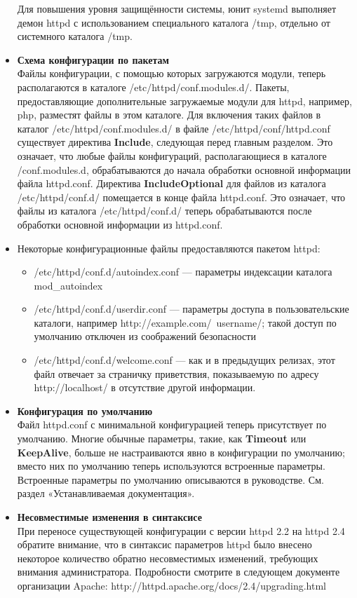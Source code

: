 \documentclass[a4paper,10pt,twoside]{article}
\begin{document}
\begin{itemize}
Для повышения уровня защищённости системы, юнит systemd выполняет демон httpd с использованием специального каталога /tmp, отдельно от системного каталога /tmp.
\item \textbf{Схема конфигурации по пакетам}\\
Файлы конфигурации, с помощью которых загружаются модули, теперь располагаются в каталоге /etc/httpd/conf.modules.d/. Пакеты, предоставляющие дополнительные загружаемые модули для httpd, например, php, разместят файлы в этом каталоге. Для включения таких файлов в каталог /etc/httpd/conf.modules.d/ в файле /etc/httpd/conf/httpd.conf существует директива \textbf{Include}, следующая перед главным разделом. Это означает, что любые файлы конфигураций, располагающиеся в каталоге /conf.modules.d, обрабатываются до начала обработки основной информации файла httpd.conf. Директива \textbf{IncludeOptional} для файлов из каталога /etc/httpd/conf.d/ помещается в конце файла httpd.conf. Это означает, что файлы из каталога /etc/httpd/conf.d/ теперь обрабатываются после обработки основной информации из httpd.conf.
\item Некоторые конфигурационные файлы предоставляются пакетом httpd:
\begin{itemize}
\item /etc/httpd/conf.d/autoindex.conf — параметры индексации каталога mod\_autoindex 
\item /etc/httpd/conf.d/userdir.conf — параметры доступа в пользовательские каталоги, например http://example.com/~username/; такой доступ по умолчанию отключен из соображений безопасности
\item /etc/httpd/conf.d/welcome.conf — как и в предыдущих релизах, этот файл отвечает за страничку приветствия, показываемую по адресу http://localhost/ в отсутствие другой информации.
\end{itemize}
\item \textbf{Конфигурация по умолчанию}\\
Файл httpd.conf с минимальной конфигурацией теперь присутствует по умолчанию. Многие обычные параметры, такие, как \textbf{Timeout} или \textbf{KeepAlive}, больше не настраиваются явно в конфигурации по умолчанию; вместо них по умолчанию теперь используются встроенные параметры. Встроенные параметры по умолчанию описываются в руководстве. См. раздел «Устанавливаемая документация».
\item \textbf{Несовместимые изменения в синтаксисе}\\
При переносе существующей конфигурации с версии httpd 2.2 на httpd 2.4 обратите внимание, что в синтаксис параметров httpd было внесено некоторое количество обратно несовместимых изменений, требующих внимания администратора. Подробности смотрите в следующем документе организации Apache: http://httpd.apache.org/docs/2.4/upgrading.html

\end{itemize}
\end{document}
